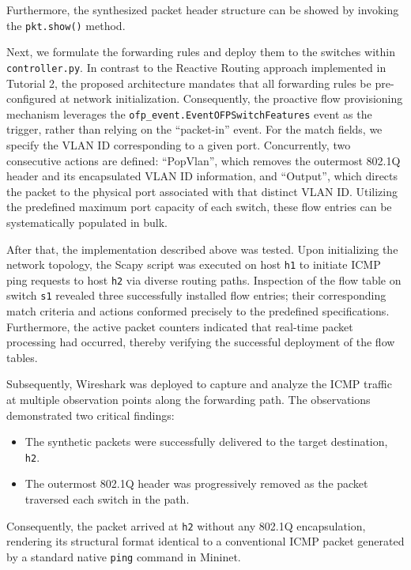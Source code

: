 \documentclass[conference]{IEEEtran}
\begin{document}
Furthermore, the synthesized packet header structure can be showed by invoking the \verb|pkt.show()| method.

Next, we formulate the forwarding rules and deploy them to the switches within \verb|controller.py|. In contrast to the Reactive Routing approach implemented in Tutorial 2, the proposed architecture mandates that all forwarding rules be pre-configured at network initialization. Consequently, the proactive flow provisioning mechanism leverages the \verb|ofp_event.EventOFPSwitchFeatures| event as the trigger, rather than relying on the ``packet-in'' event. For the match fields, we specify the VLAN ID corresponding to a given port. Concurrently, two consecutive actions are defined: ``PopVlan'', which removes the outermost 802.1Q header and its encapsulated VLAN ID information, and ``Output'', which directs the packet to the physical port associated with that distinct VLAN ID. Utilizing the predefined maximum port capacity of each switch, these flow entries can be systematically populated in bulk.

After that, the implementation described above was tested. Upon initializing the network topology, the Scapy script was executed on host \verb|h1| to initiate ICMP ping requests to host \verb|h2| via diverse routing paths. Inspection of the flow table on switch \verb|s1| revealed three successfully installed flow entries; their corresponding match criteria and actions conformed precisely to the predefined specifications. Furthermore, the active packet counters indicated that real-time packet processing had occurred, thereby verifying the successful deployment of the flow tables.

Subsequently, Wireshark was deployed to capture and analyze the ICMP traffic at multiple observation points along the forwarding path. The observations demonstrated two critical findings:

\begin{itemize}

\item The synthetic packets were successfully delivered to the target destination, \verb|h2|.
\item The outermost 802.1Q header was progressively removed as the packet traversed each switch in the path.
\end{itemize}


Consequently, the packet arrived at \verb|h2| without any 802.1Q encapsulation, rendering its structural format identical to a conventional ICMP packet generated by a standard native \verb|ping| command in Mininet.
\end{document}
